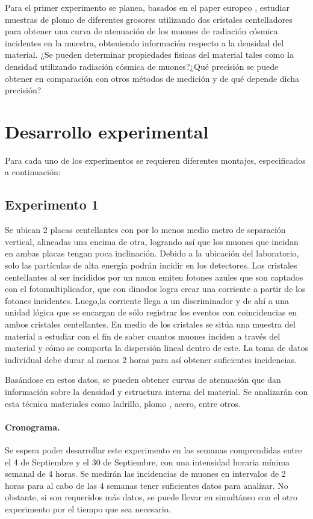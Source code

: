 \documentclass[notitlepage,letterpaper,12pt]{article} %
\begin{document}
Para el primer experimento se planea, basados en el paper europeo \cite{muones}, estudiar muestras de plomo de diferentes grosores utilizando dos cristales centelladores para obtener una curva de atenuación de los muones de radiación cósmica incidentes en la muestra, obteniendo información respecto a la densidad del material. ¿Se pueden determinar propiedades fisicas del material tales como la densidad utilizando radiación cósmica de muones?¿Qué precisión se puede obtener en comparación con otros métodos de medición y de qué depende dicha precisión?


\section{Desarrollo experimental}

Para cada uno de los experimentos se requieren diferentes montajes, especificados a continuación:
\subsection{Experimento 1}
Se ubican 2 placas centellantes con por lo menos medio metro de separación vertical, alineadas una encima de otra, logrando así que los muones que incidan en ambas placas tengan poca inclinación. Debido a la ubicación del laboratorio, solo las partículas de alta energía podrán incidir en los detectores. Los cristales centellantes al ser incididos por un muon emiten fotones azules que son captados con el fotomultiplicador, que con dinodos logra crear una corriente a partir de los fotones incidentes. Luego,la corriente llega a un discriminador y de ahí a una unidad lógica que se encargan de sólo registrar los eventos con coincidencias en ambos cristales centellantes. En medio de los cristales se sitúa una muestra del material a estudiar con el fin de saber cuantos muones inciden a través del material y cómo se comporta la dispersión lineal dentro de este. La toma de datos individual debe durar al menos 2 horas para así obtener suficientes incidencias.

Basándose en estos datos, se pueden obtener curvas de atenuación que dan información sobre la densidad y estructura interna del material. Se analizarán con esta técnica materiales como ladrillo, plomo , acero, entre otros.
\paragraph{Cronograma.} Se espera poder desarrollar este experimento en las semanas comprendidas entre el 4 de Septiembre y el 30 de Septiembre, con una intensidad horaria mínima semanal de 4 horas. Se medirán las incidencias de muones en intervalos de 2 horas para al cabo de las 4 semanas tener suficientes datos para analizar. No obstante, si son requeridos más datos, se puede llevar en simultáneo con el otro experimento por el tiempo que sea necesario.
\end{document}
